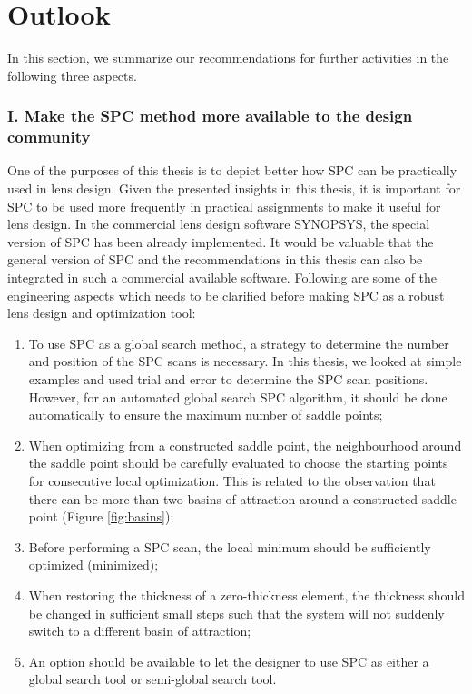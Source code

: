 \newpage

\section{Outlook}
In this section, we summarize our recommendations for further activities in the following three aspects.

\subsubsection{I. Make the SPC method more available to the design community}

One of the purposes of this thesis is to depict better how SPC can be practically used in lens design. Given the presented insights in this thesis, it is important for SPC to be used more frequently in practical assignments to make it useful for lens design. In the commercial lens design software SYNOPSYS\texttrademark \cite{SYNOPSYSSW}, the special version of SPC has been already implemented. It would be valuable that the general version of SPC and the recommendations in this thesis can also be integrated in such a commercial available software. Following are some of the engineering aspects which needs to be clarified before making SPC as a robust lens design and optimization tool:
\begin{enumerate}[nosep]
\item To use SPC as a global search method, a strategy to determine the number and position of the SPC scans is necessary. In this thesis, we looked at simple examples and used trial and error to determine the SPC scan positions. However, for an automated global search SPC algorithm, it should be done automatically to ensure the maximum number of saddle points;
\item When optimizing from a constructed saddle point, the neighbourhood around the saddle point should be carefully evaluated to choose the starting points for consecutive local optimization. This is related to the observation that there can be more than two basins of attraction around a constructed saddle point (Figure \ref{fig:basins});
\item Before performing a SPC scan, the local minimum should be sufficiently optimized (minimized); 
\item When restoring the thickness of a zero-thickness element, the thickness should be changed in sufficient small steps such that the system will not suddenly switch to a different basin of attraction; 
\item  An option should be available to let the designer to use SPC as either a global search tool or semi-global search tool. 
\end{enumerate}


